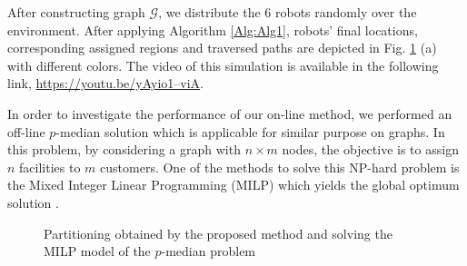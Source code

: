 \documentclass[smallcondensed]{svjour3}
\begin{document}
After constructing graph $\mathcal G$, we distribute the 6 robots randomly over the environment. After applying Algorithm \ref{Alg:Alg1}, robots' final locations, corresponding assigned regions and traversed paths are depicted in Fig. \ref{fig:googledeployed} (a) with different colors. The video of this simulation is available in the following link, \href{https://youtu.be/yAyio1--viA}{https://youtu.be/yAyio1--viA}.

In order to investigate the performance of our on-line method, we performed an off-line $p$-median solution \cite{Daskin2015} which is applicable for similar purpose on graphs. In this problem, by considering a graph with $n \times m$ nodes, the objective is to assign $n$ facilities to $m$ customers. One of the methods to solve this NP-hard problem is the Mixed Integer Linear Programming (MILP) which yields the global optimum solution \cite{Edson2005}.

\begin{figure}[H]
	\centering	
	\caption{Partitioning obtained by the proposed method and solving the MILP model of the $p$-median problem}
	\label{fig:googledeployed}
\end{figure}
\end{document}
